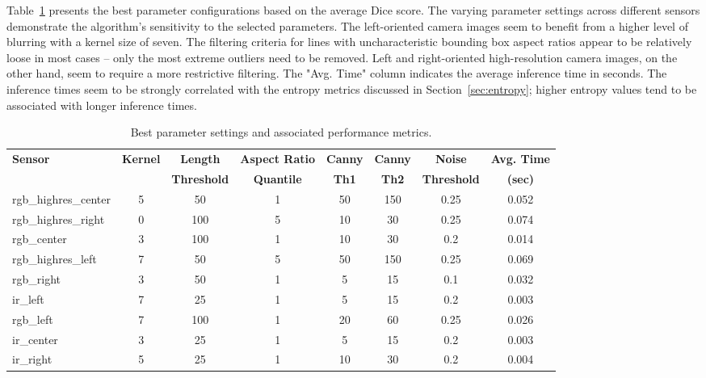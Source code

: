 \documentclass[Master,MDS,english]{BASE/twbook} %
\begin{document}
Table~\ref{tab:sensor_parameters} presents the best parameter configurations based on the average Dice score. The varying parameter settings across different sensors demonstrate the algorithm's sensitivity to the selected parameters.
The left-oriented camera images seem to benefit from a higher level of blurring with a kernel size of seven. 
The filtering criteria for lines with uncharacteristic bounding box aspect ratios appear to be relatively loose in most cases -- only the most extreme outliers need to be removed. Left and right-oriented high-resolution camera images, on the other hand, seem to require a more restrictive filtering. 
The "Avg. Time" column indicates the average inference time in seconds. The inference times seem to be strongly correlated with the entropy metrics discussed in Section~\ref{sec:entropy}; higher entropy values tend to be associated with longer inference times.


\begin{table}[H]
\scriptsize
    \centering
    \begin{tabular}{|l|c|c|c|c|c|c|c|}
        \hline
        \textbf{Sensor} & \textbf{Kernel} & \textbf{Length}  & \textbf{Aspect Ratio } & \textbf{Canny } & \textbf{Canny } & \textbf{Noise} & \textbf{Avg. Time } \\
         &  & \textbf{Threshold} & \textbf{Quantile} & \textbf{Th1} & \textbf{Th2} & \textbf{Threshold} & \textbf{(sec)} \\
        \hline
        rgb\_highres\_center & 5 & 50 & 1 & 50 & 150 & 0.25 & 0.052 \\
        rgb\_highres\_right & 0 & 100 & 5 & 10 & 30 & 0.25 & 0.074 \\
        rgb\_center & 3 & 100 & 1 & 10 & 30 & 0.2 & 0.014 \\
        rgb\_highres\_left & 7 & 50 & 5 & 50 & 150 & 0.25 & 0.069 \\
        rgb\_right & 3 & 50 & 1 & 5 & 15 & 0.1 & 0.032 \\
        ir\_left & 7 & 25 & 1 & 5 & 15 & 0.2 & 0.003 \\
        rgb\_left & 7 & 100 & 1 & 20 & 60 & 0.25 & 0.026 \\
        ir\_center & 3 & 25 & 1 & 5 & 15 & 0.2 & 0.003 \\
        ir\_right & 5 & 25 & 1 & 10 & 30 & 0.2 & 0.004 \\
        \hline
    \end{tabular}
      \caption{Best parameter settings and associated performance metrics.}
    \label{tab:sensor_parameters}
\end{table}
\end{document}
